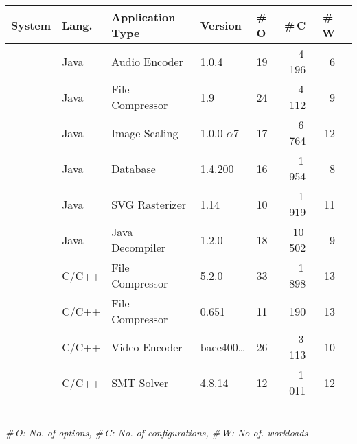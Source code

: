 \begin{tabular}{p{1.1cm}p{0.7cm}p{1.9cm}p{1.0cm}p{0.2cm}rrr}
		\toprule
		\textbf{System} & \textbf{Lang.} & \textbf{Application Type} & \textbf{Version} & \textbf{\#\,O} & \textbf{\#\,C} & \textbf{\#\,W}  \\
		\midrule
		\jumper & Java & Audio Encoder & 1.0.4 & 19 & 4\,196 & 6   \\
		
		\kanzi &Java  & File Compressor & 1.9 & 24 & 4\,112 & 9 \\
			
		\dconvert & Java & Image Scaling & 1.0.0-$\alpha$7 & 17 & 6\,764 & 12  \\
				
		\htwo & Java & Database & 1.4.200 & 16 & 1\,954  & 8  \\
		
		\batik & Java & SVG Rasterizer & 1.14 & 10 & 1\,919 &  11  \\
		
		\jadx & Java & Java Decompiler & 1.2.0 & 18 & 10\,502 & 9  \\
		
		\midrule
		
		 \xz & C/C++ & File Compressor & 5.2.0 & 33 & 1\,898 & 13  \\
		\lrzip & C/C++ & File Compressor & 0.651 & 11 & 190 & 13  \\
		
		\xzwo & C/C++ & Video Encoder & baee400\ldots & 26 & 3\,113 & 10  \\
		\zdrei & C/C++ & SMT Solver & 4.8.14 & 12 & 1\,011 & 12  \\
\bottomrule

\end{tabular}\\
{\centering\vspace{1mm}\textit{\#\,O: No. of options, \#\,C: No. of configurations, \#\,W: No of. workloads}}
